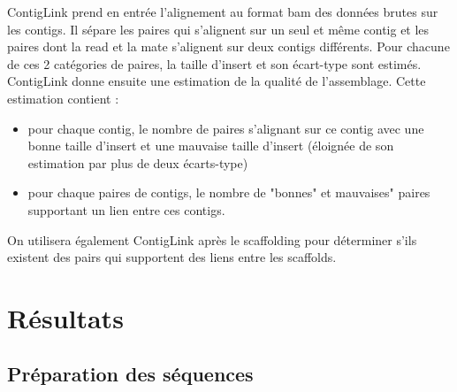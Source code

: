 \documentclass[a4paper]{article}
\begin{document}
ContigLink prend en entrée l'alignement au format bam des données brutes sur les contigs. Il sépare les paires qui s'alignent sur un seul et même contig et les paires dont la read et la mate s'alignent sur deux contigs différents. Pour chacune de ces 2 catégories de paires, la taille d'insert et son écart-type sont estimés. ContigLink donne ensuite une estimation de la qualité de l'assemblage. Cette estimation contient : 
\begin{itemize}
\item pour chaque contig, le nombre de paires s'alignant sur ce contig avec une bonne taille d'insert et une mauvaise taille d'insert (éloignée de son estimation par plus de deux écarts-type)
\item pour chaque paires de contigs, le nombre de "bonnes" et mauvaises" paires supportant un lien entre ces contigs.
\end{itemize}

On utilisera également ContigLink après le scaffolding pour déterminer s'ils existent des pairs qui supportent des liens entre les scaffolds. 

\section{Résultats}

\subsection{Préparation des séquences}
\end{document}
